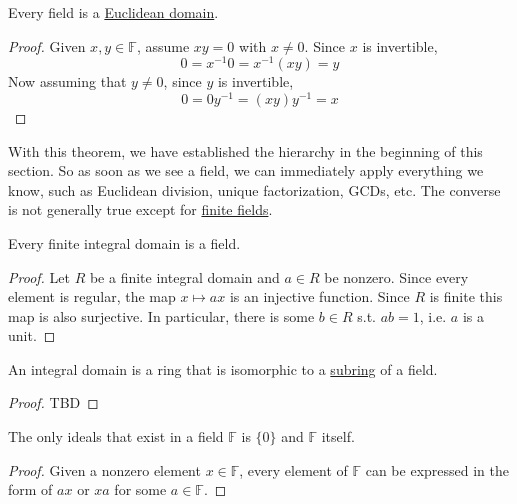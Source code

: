   \begin{theorem}
    \label{thm:fields-are-euclidean-domains}
    Every field is a \hyperref[def:euclidean-domain]{Euclidean domain}. 
  \end{theorem}
  \begin{proof}
    Given $x, y \in \mathbb{F}$, assume $x y = 0$ with $x \neq 0$. Since $x$ is invertible,
    \begin{equation}
      0 = x^{-1} 0 = x^{-1} (x y) = y
    \end{equation}
    Now assuming that $y \neq 0$, since $y$ is invertible, 
    \begin{equation}
      0 = 0 y^{-1} = (x y) y^{-1} = x
    \end{equation}
  \end{proof}

  With this theorem, we have established the hierarchy in the beginning of this section. So as soon as we see a field, we can immediately apply everything we know, such as Euclidean division, unique factorization, GCDs, etc. The converse is not generally true except for \hyperref[st-thm:finite-fields]{finite fields}. 

  \begin{theorem}
    \label{thm:wedderburns-little-theorem}
    Every finite integral domain is a field. 
  \end{theorem} 
  \begin{proof}
    Let $R$ be a finite integral domain and $a \in R$ be nonzero. Since every element is regular, the map $x \mapsto ax$ is an injective function. Since $R$ is finite this map is also surjective. In particular, there is some $b \in R$ s.t. $ab = 1$, i.e. $a$ is a unit. 
  \end{proof}

  \begin{theorem}
    \label{thm:integral-domains-are-embedded-in-fields}
    An integral domain is a ring that is isomorphic to a \hyperref[def:subring]{subring} of a field. 
  \end{theorem}
  \begin{proof}
    TBD
  \end{proof}

  \begin{theorem}
    \label{thm:ideals-of-fields}
    The only ideals that exist in a field $\mathbb{F}$ is $\{0\}$ and $\mathbb{F}$ itself. 
  \end{theorem}
  \begin{proof}
    Given a nonzero element $x \in \mathbb{F}$, every element of $\mathbb{F}$ can be expressed in the form of $a x$ or $x a$ for some $a \in \mathbb{F}$. 
  \end{proof}


